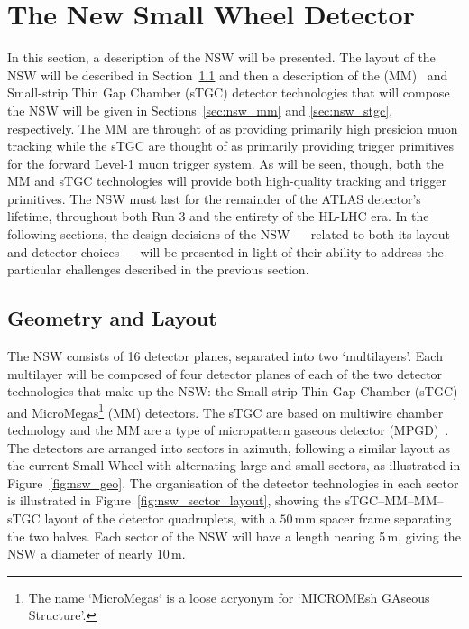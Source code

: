 \section{The New Small Wheel Detector}
\label{sec:nsw_detector}

In this section, a description of the NSW will be presented.
The layout of the NSW will be described in Section~\ref{sec:nsw_geo}
and then a description of the \micromegas (MM)~\cite{Giomataris:1995fq} and Small-strip Thin Gap Chamber (sTGC)
detector technologies that will compose the NSW
will be given in Sections~\ref{sec:nsw_mm} and \ref{sec:nsw_stgc}, respectively.
The MM are throught of as providing primarily high presicion muon tracking
while the sTGC are thought of as primarily providing trigger primitives for the forward Level-1 muon trigger system.
As will be seen, though, both the MM and sTGC technologies will provide both high-quality tracking and trigger primitives.
The NSW must last for the remainder of the ATLAS detector's lifetime, throughout
both Run 3 and the entirety of the HL-LHC era.
In the following sections, the design decisions of the NSW --- related to both its layout 
and detector choices --- will be presented in light of their ability to address
the particular challenges described in the previous section.

\subsection{Geometry and Layout}
\label{sec:nsw_geo}

The NSW consists of 16 detector planes, separated into two `multilayers'.
Each multilayer will be composed of four detector planes of each of the two
detector technologies that make up the NSW: the Small-strip Thin Gap Chamber (sTGC)
and MicroMegas\footnote{The name `MicroMegas` is a loose acryonym for `MICROMEsh GAseous Structure'.} (MM)
detectors.
The sTGC are based on multiwire chamber technology and the MM are a type of
micropattern gaseous detector (MPGD)~\cite{MPGD}.
The detectors are arranged into sectors in azimuth, following a similar layout
as the current Small Wheel with alternating large and small sectors, as illustrated in Figure~\ref{fig:nsw_geo}.
The organisation of the detector technologies in each sector is illustrated in Figure~\ref{fig:nsw_sector_layout},
showing the sTGC--MM--MM--sTGC layout of the detector quadruplets, with a $50$\,mm spacer
frame separating the two halves.
Each sector of the NSW will have a length nearing 5\,m, giving the NSW a diameter of
nearly 10\,m.

